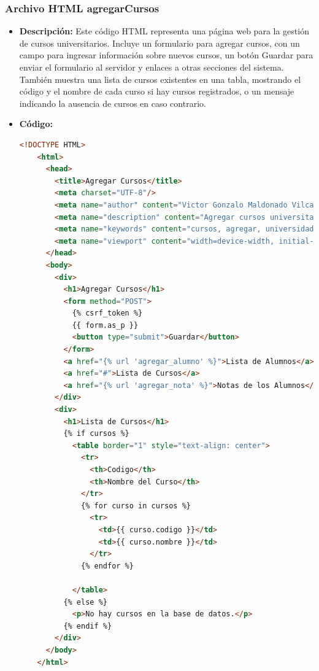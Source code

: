 \documentclass{article}
\begin{document}

  \subsubsection{Archivo HTML agregarCursos}
  \begin{itemize}
    \item \textbf{Descripción: }Este código HTML representa una página web para la gestión de cursos universitarios. 
    Incluye un formulario para agregar cursos, con un campo para ingresar información sobre nuevos cursos, un botón Guardar 
    para enviar el formulario al servidor y enlaces a otras secciones del sistema. También muestra una lista de cursos 
    existentes en una tabla, mostrando el código y el nombre de cada curso si hay cursos registrados, o un mensaje indicando 
    la ausencia de cursos en caso contrario.
    \item \textbf{Código: }
    \begin{lstlisting}[language=html, caption={HTML agregarCursos}]
    <!DOCTYPE HTML>
    <html>
      <head>
        <title>Agregar Cursos</title>
        <meta charset="UTF-8"/>
        <meta name="author" content="Victor Gonzalo Maldonado Vilca"/>
        <meta name="description" content="Agregar cursos universitarios"/>
        <meta name="keywords" content="cursos, agregar, universidad"/>
        <meta name="viewport" content="width=device-width, initial-scale=1.0"/>
      </head>
      <body>
        <div>
          <h1>Agregar Cursos</h1>
          <form method="POST">
            {% csrf_token %}
            {{ form.as_p }}
            <button type="submit">Guardar</button>
          </form>
          <a href="{% url 'agregar_alumno' %}">Lista de Alumnos</a>
          <a href="#">Lista de Cursos</a>
          <a href="{% url 'agregar_nota' %}">Notas de los Alumnos</a>
        </div>
        <div>
          <h1>Lista de Cursos</h1>
          {% if cursos %}
            <table border="1" style="text-align: center">
              <tr>
                <th>Codigo</th>
                <th>Nombre del Curso</th>
              </tr>
              {% for curso in cursos %}
                <tr>
                  <td>{{ curso.codigo }}</td>
                  <td>{{ curso.nombre }}</td>
                </tr>
              {% endfor %}
            
            </table>
          {% else %}
            <p>No hay cursos en la base de datos.</p>
          {% endif %}
        </div>
      </body>
    </html>
    \end{lstlisting}
    
  \end{itemize}
 
\end{document}
